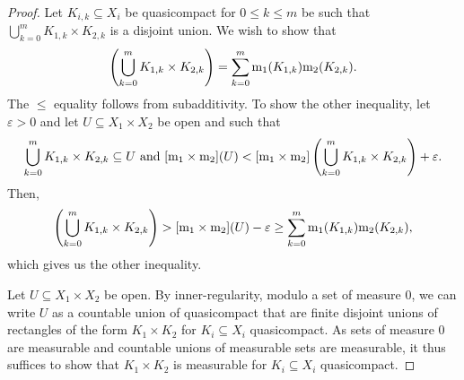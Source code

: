 \begin{thm}
\begin{proof}
Let $K_{i,k}\subseteq X_i$ be quasicompact for $0\leq k\leq m$ be such that $\bigcup _{k=0}^mK_{1,k}\times K_{2,k}$ is a disjoint union.  We wish to show that
\begin{equation}
[\meas _1\times \meas _2]\left( \bigcup _{k=0}^mK_{1,k}\times K_{2,k}\right) =\sum _{k=0}^m\meas _1(K_{1,k})\meas _2(K_{2,k}).
\end{equation}
The $\leq$ equality follows from subadditivity.  To show the other inequality, let $\varepsilon >0$ and let $U\subseteq X_1\times X_2$ be open and such that
\begin{equation}
\bigcup _{k=0}^mK_{1,k}\times K_{2,k}\subseteq U\text{ and }[\mathrm{m} _1\times \mathrm{m} _2](U)<[\mathrm{m} _1\times \mathrm{m} _2]\left( \bigcup _{k=0}^mK_{1,k}\times K_{2,k}\right) +\varepsilon .
\end{equation}
Then,
\begin{equation}
[\meas _1\times \meas _2]\left( \bigcup _{k=0}^mK_{1,k}\times K_{2,k}\right) >[\meas _1\times \meas _2](U)-\varepsilon \geq \sum _{k=0}^m\meas _1(K_{1,k})\meas _2(K_{2,k}),
\end{equation}
which gives us the other inequality.

Let $U\subseteq X_1\times X_2$ be open.  By inner-regularity, modulo a set of measure $0$, we can write $U$ as a countable union of quasicompact that are finite disjoint unions of rectangles of the form $K_1\times K_2$ for $K_i\subseteq X_i$ quasicompact.  As sets of measure $0$ are measurable and countable unions of measurable sets are measurable, it thus suffices to show that $K_1\times K_2$ is measurable for $K_i\subseteq X_i$ quasicompact.


\end{proof}
\end{thm}
